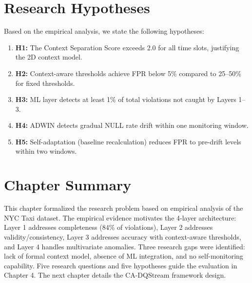 \section{Research Hypotheses}

Based on the empirical analysis, we state the following hypotheses:

\begin{enumerate}
    \item \textbf{H1:} The Context Separation Score exceeds 2.0 for all time slots, justifying the 2D context model.
    \item \textbf{H2:} Context-aware thresholds achieve FPR below 5\% compared to 25--50\% for fixed thresholds.
    \item \textbf{H3:} ML layer detects at least 1\% of total violations not caught by Layers 1--3.
    \item \textbf{H4:} ADWIN detects gradual NULL rate drift within one monitoring window.
    \item \textbf{H5:} Self-adaptation (baseline recalculation) reduces FPR to pre-drift levels within two windows.
\end{enumerate}

\section{Chapter Summary}

This chapter formalized the research problem based on empirical analysis of the NYC Taxi dataset. The empirical evidence motivates the 4-layer architecture: Layer 1 addresses completeness (84\% of violations), Layer 2 addresses validity/consistency, Layer 3 addresses accuracy with context-aware thresholds, and Layer 4 handles multivariate anomalies. Three research gaps were identified: lack of formal context model, absence of ML integration, and no self-monitoring capability. Five research questions and five hypotheses guide the evaluation in Chapter 4. The next chapter details the CA-DQStream framework design.
